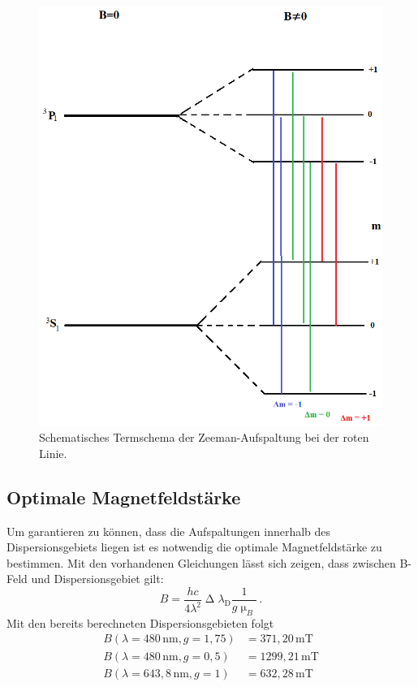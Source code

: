 \begin{figure}
  \centering
  \includegraphics[scale=0.4]{Bilder/2Termschema.png}
  \caption{Schematisches Termschema der Zeeman-Aufspaltung bei der roten Linie.}
\end{figure}

\subsection{Optimale Magnetfeldstärke}
Um garantieren zu können, dass die Aufspaltungen innerhalb des Dispersionsgebiets liegen ist es notwendig die optimale Magnetfeldstärke zu bestimmen. Mit den vorhandenen Gleichungen lässt sich zeigen, dass zwischen B-Feld und Dispersionsgebiet gilt:
\begin{equation}
B=\frac{hc}{4\lambda^2}\upDelta\lambda_\text{D}\frac{1}{g\upmu_B}\,.
\end{equation}
Mit den bereits berechneten Dispersionsgebieten folgt
\begin{align}
B\left(\lambda=480\,\si{\nm}, g=1{,}75\right)&=371{,}20\,\si{\milli\tesla}\nonumber\\
B\left(\lambda=480\,\si{\nm}, g=0{,}5\right)&=1299{,}21\,\si{\milli\tesla}\nonumber\\
B\left(\lambda=643{,}8\,\si{\nm}, g=1\right)&=632{,}28\,\si{\milli\tesla}\nonumber
\end{align}

